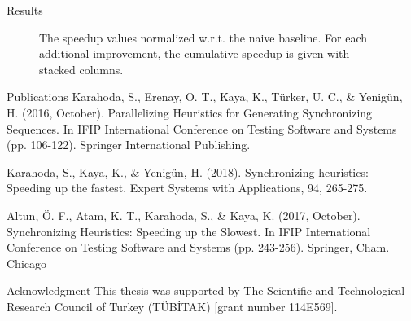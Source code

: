 \documentclass{beamer}
\begin{document}
\begin{frame}{Results}

\begin{figure}[ht]
	\centering
	\caption{The speedup values normalized w.r.t. the naive baseline. For each additional improvement, the cumulative speedup is given with stacked columns.}
	\label{fig:speedups}
\end{figure}
\end{frame}

\begin{frame}{Publications}
\small
Karahoda, S., Erenay, O. T., Kaya, K., T\"{u}rker, U. C., \& Yenig\"{u}n, H. (2016, October). Parallelizing Heuristics for Generating Synchronizing Sequences. In IFIP International Conference on Testing Software and Systems (pp. 106-122). Springer International Publishing.

\medskip

Karahoda, S., Kaya, K., \& Yenig\"{u}n, H. (2018). Synchronizing heuristics: Speeding up the fastest. Expert Systems with Applications, 94, 265-275.

\medskip

Altun, \"{O}. F., Atam, K. T., Karahoda, S., \& Kaya, K. (2017, October). Synchronizing Heuristics: Speeding up the Slowest. In IFIP International Conference on Testing Software and Systems (pp. 243-256). Springer, Cham.
Chicago	

\end{frame}

\begin{frame}{Acknowledgment}
This thesis was supported by The Scientific and Technological Research Council of Turkey (T\"{U}B\.{I}TAK) [grant number 114E569]. 
\end{frame}
\end{document}
